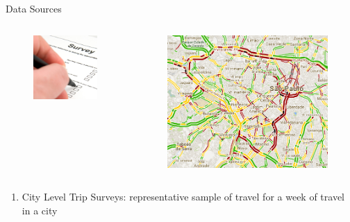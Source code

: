 \documentclass[newPxFont]{beamer}
\begin{document}
\begin{frame}[c]{Data Sources}
	\begin{columns}
		\begin{column}{.5\linewidth}
			\begin{figure}
				\centering
				\includegraphics[width=0.6\linewidth]{survey.jpg}
			\end{figure}
		\end{column}
		\begin{column}{.5\linewidth}
			\begin{figure}
				\centering
				\includegraphics[width=0.7\linewidth]{SaoPaoloGoogle.png}
			\end{figure}
		\end{column}
	\end{columns}
	\begin{enumerate}
		\item{City Level Trip Surveys: representative sample of travel for a week of travel in a city}\\

\end{enumerate}
\end{frame}
\end{document}
